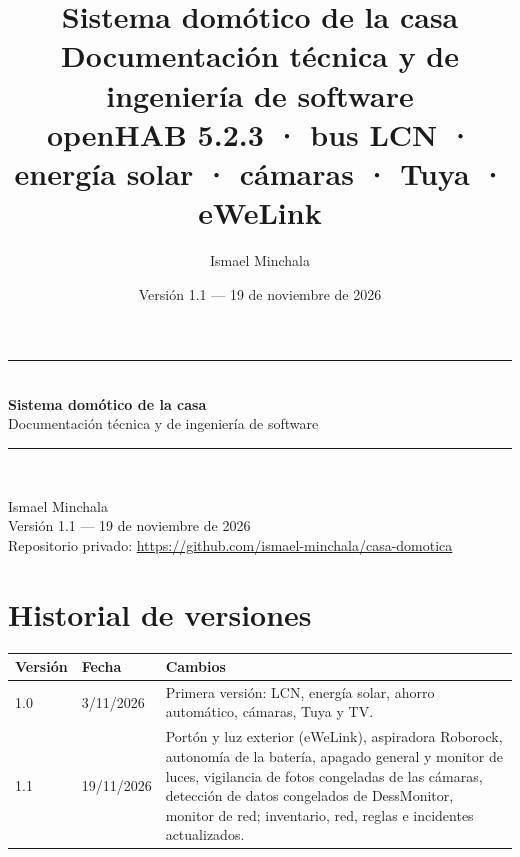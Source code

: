 \documentclass[11pt,a4paper]{report}
\title{\vspace{-1cm}\textcolor{azul}{\Huge\bfseries Sistema domótico de la casa}\\[6pt]
       \Large Documentación técnica y de ingeniería de software\\[4pt]
       \large openHAB 5.2.3 · bus LCN · energía solar · cámaras · Tuya · eWeLink}
\author{Ismael Minchala}
\date{Versión 1.1 — 19 de noviembre de 2026}
\begin{document}
\begin{titlepage}
\centering
\vspace*{1.5cm}
{\color{azul}\rule{\linewidth}{1.2pt}}\\[0.6cm]
{\Huge\bfseries\color{azul} Sistema domótico de la casa}\\[0.4cm]
{\Large Documentación técnica y de ingeniería de software}\\[0.3cm]
{\color{azul}\rule{\linewidth}{1.2pt}}\\[1.2cm]


\vfill
{\large Ismael Minchala}\\[4pt]
{\large Versión 1.1 — 19 de noviembre de 2026}\\[8pt]
{\small Repositorio privado: \url{https://github.com/ismael-minchala/casa-domotica}}
\end{titlepage}

\section*{Historial de versiones}
\begin{tabularx}{\linewidth}{@{}llX@{}}
\toprule
\textbf{Versión} & \textbf{Fecha} & \textbf{Cambios}\\\midrule
1.0 & 3/11/2026 & Primera versión: LCN, energía solar, ahorro automático, cámaras, Tuya y TV.\\
1.1 & 19/11/2026 & Portón y luz exterior (eWeLink), aspiradora Roborock, autonomía de la batería,
  apagado general y monitor de luces, vigilancia de fotos congeladas de las cámaras, detección de datos
  congelados de DessMonitor, monitor de red; inventario, red, reglas e incidentes actualizados.\\
\bottomrule
\end{tabularx}
\end{document}
